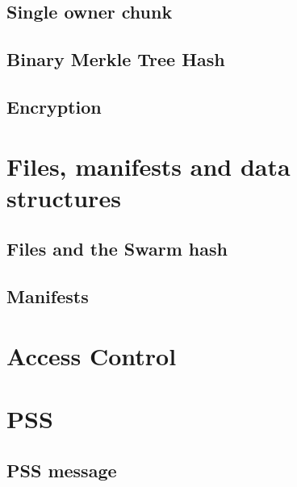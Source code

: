 \subsection{Single owner chunk \statusyellow}\label{spec:format:soc}

\subsection{Binary Merkle Tree Hash \statusyellow}\label{spec:format:bmt}

\subsection{Encryption \statusyellow}\label{spec:format:encryption}


\section{Files, manifests and data structures}\label{spec:format:data-structures}
\subsection{Files and the Swarm hash \statusyellow}\label{spec:format:files}

\subsection{Manifests \statusyellow}\label{spec:format:manifests}

%


\section{Access Control \statusorange}\label{spec:format:access-control}


\section{PSS \statusyellow}

\subsection{PSS message}
\label{spec:format:pss-messsage}

